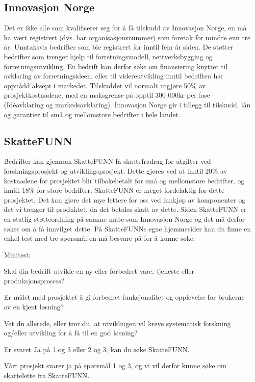 \subsection{Innovasjon Norge}
Det er ikke alle som kvalifiserer seg for å få tilskudd av Innovasjon Norge, en må ha vært registrert (dvs. har organisasjonsnummer) som foretak for mindre enn tre år. Unntaksvis bedrifter som ble registrert for inntil fem år siden. 
De støtter bedrifter som trenger hjelp til forretningsmodell, nettverksbygging og forretningsutvikling. En bedrift kan derfor søke om finansiering knyttet til avklaring av forretningsideen, eller til videreutvikling inntil bedriften har oppnådd aksept i markedet. 
Tilskuddet vil normalt utgjøre 50\% av prosjektkostnadene, med en maksgrense på opptil 300 000kr per fase (Idèavklaring og markedsavklaring). 
Innovasjon Norge gir i tillegg til tilskudd, lån og garantier til små og mellomstore bedrifter i hele landet.

\subsection{SkatteFUNN}
Bedrifter kan gjennom SkatteFUNN få skattefradrag for utgifter ved forskningsprosjekt og utviklingsprosjekt. Dette gjøres ved at inntil 20\% av kostnadene for prosjektet blir tilbakebetalt for små og mellomstore bedrifter, og inntil 18\% for store bedrifter. 
SkatteFUNN er meget fordelaktig for dette prosjektet. Det kan gjøre det mye lettere for oss ved innkjøp av komponenter og det vi trenger til produktet, da det betales skatt av dette. Siden SkatteFUNN er en statlig støtteordning på samme måte som Innovasjon Norge og det må derfor søkes om å få innvilget dette. På SkatteFUNNs egne hjemmesider kan du finne en enkel test med tre spørsmål en må besvare på for å kunne søke: 

Minitest:
 
Skal din bedrift utvikle en ny eller forbedret vare, tjeneste eller produksjonsprosess? 

Er målet med prosjektet å gi forbedret funksjonalitet og opplevelse for brukerne av en kjent løsning? 

Vet du allerede, eller tror du, at utviklingen vil kreve systematisk forskning og/eller utvikling for å få til en god løsning? 

Er svaret Ja på 1 og 3 eller 2 og 3, kan du søke SkatteFUNN.

Vårt prosjekt svarer ja på spørsmål 1 og 3, og vi vil derfor kunne søke om skattelette fra SkatteFUNN.  

